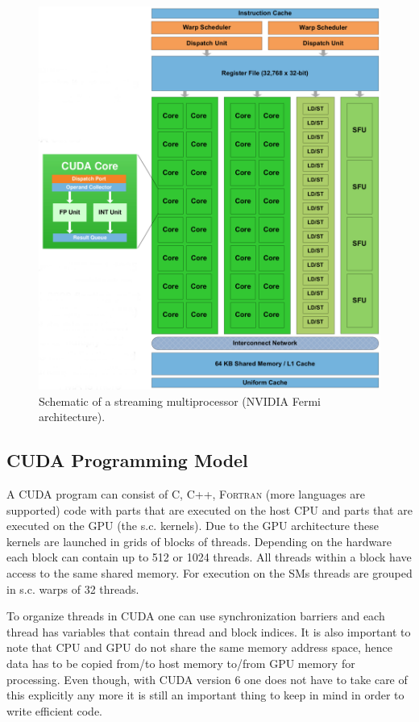 \documentclass[paper=a4, fontsize=11pt]{scrartcl} %
\numberwithin{equation}{section} %
\numberwithin{figure}{section} %
\numberwithin{table}{section} %
\begin{document}
\begin{figure}
\centering
\includegraphics[width=.8\linewidth]{images/fermi_sm.png}
\caption{Schematic of a streaming multiprocessor (NVIDIA Fermi architecture)\cite{gpu_nvidia_fermi}.}
\label{fig:fermi_sm}
\end{figure}

\subsection{CUDA Programming Model}
A CUDA program can consist of \textsc{C}, \textsc{C++}, \textsc{Fortran} (more languages are supported) code with parts that are executed on the host CPU and parts that are executed on the GPU (the s.c. kernels). Due to the GPU architecture these kernels are launched in grids of blocks of threads. Depending on the hardware each block can contain up to 512 or 1024 threads. All threads within a block have access to the same shared memory. For execution on the SMs threads are grouped in s.c. warps of 32 threads.

To organize threads in CUDA one can use synchronization barriers and each thread has variables that contain thread and block indices. It is also important to note that CPU and GPU do not share the same memory address space, hence data has to be copied from/to host memory to/from GPU memory for processing. Even though, with CUDA version 6 one does not have to take care of this explicitly any more it is still an important thing to keep in mind in order to write efficient code.
\end{document}
